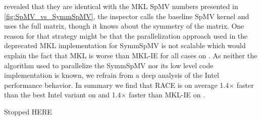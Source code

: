  revealed that they are identical with the MKL \acrshort{SpMV} numbers presented in \cref{fig:SpMV_vs_SymmSpMV}, \ie the inspector calls the baseline \acrshort{SpMV} kernel and uses the full matrix, though it knows about the symmetry of the matrix. One reason for that strategy might be that the parallelization approach used in the deprecated MKL implementation for \acrshort{SymmSpMV} is not scalable which would explain the fact that MKL is worse than MKL-IE for all cases on \SKX.  As neither the algorithm used to parallelize the \acrshort{SymmSpMV} nor its low level code implementation is known, we refrain from a deep analysis of the Intel performance behavior. 
 In summary we find that \acrshort{RACE} is on average 1.4$\times$ faster than the best Intel variant on \IVB and  1.4$\times$ faster than MKL-IE on \SKX.



{\GW Stopped HERE} 


